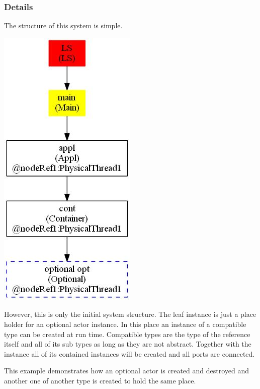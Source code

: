 \subsubsection{Details}

The structure of this system is simple.

\includegraphics[scale=0.7]{images/039-DynAct1-Main_instanceTree.jpg}

However, this is only the initial system structure.
The leaf instance is just a place holder for an optional actor instance.
In this place an instance of a compatible type can be created at run time.
Compatible types are the type of the reference itself and all of its sub types as long as they are not abstract.
Together with the instance all of its contained instances will be created and all ports are connected.

This example demonstrates how an optional actor is created and destroyed and another one of another type
is created to hold the same place.

